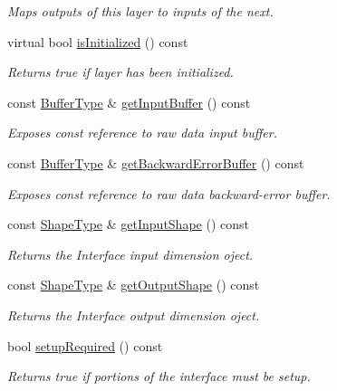 \begin{DoxyCompactItemize}
\begin{DoxyCompactList}\small\item\em Maps outputs of this layer to inputs of the next. \end{DoxyCompactList}\item 
virtual bool \hyperlink{classffnn_1_1layer_1_1_layer_a2166b32e32c3f4e979ed7454ddb5817f}{is\-Initialized} () const 
\begin{DoxyCompactList}\small\item\em Returns true if layer has been initialized. \end{DoxyCompactList}\item 
const \hyperlink{classffnn_1_1layer_1_1_layer_ae755be4e0e146b543c0b46a9b8e0bb01}{Buffer\-Type} \& \hyperlink{classffnn_1_1layer_1_1_layer_a8049c939bc452bd5453227d1ce1a35f3}{get\-Input\-Buffer} () const 
\begin{DoxyCompactList}\small\item\em Exposes const reference to raw data input buffer. \end{DoxyCompactList}\item 
const \hyperlink{classffnn_1_1layer_1_1_layer_ae755be4e0e146b543c0b46a9b8e0bb01}{Buffer\-Type} \& \hyperlink{classffnn_1_1layer_1_1_layer_a0caad62750e9610e607fb18d87df63b8}{get\-Backward\-Error\-Buffer} () const 
\begin{DoxyCompactList}\small\item\em Exposes const reference to raw data backward-\/error buffer. \end{DoxyCompactList}\item 
const \hyperlink{classffnn_1_1layer_1_1_layer_ae2f2d0063ab4b2c2a3a6ebf81f4ec32f}{Shape\-Type} \& \hyperlink{classffnn_1_1layer_1_1_layer_a0f69fc9185b2d496fea7be9a5d9adb62}{get\-Input\-Shape} () const 
\begin{DoxyCompactList}\small\item\em Returns the Interface input dimension oject. \end{DoxyCompactList}\item 
const \hyperlink{classffnn_1_1layer_1_1_layer_ae2f2d0063ab4b2c2a3a6ebf81f4ec32f}{Shape\-Type} \& \hyperlink{classffnn_1_1layer_1_1_layer_a2b6713211f1a5e702ce9ce8cd72e4854}{get\-Output\-Shape} () const 
\begin{DoxyCompactList}\small\item\em Returns the Interface output dimension oject. \end{DoxyCompactList}\item 
bool \hyperlink{classffnn_1_1layer_1_1_layer_a2ed6596711548678da8ef9ed9e59b06c}{setup\-Required} () const 
\begin{DoxyCompactList}\small\item\em Returns true if portions of the interface must be setup. \end{DoxyCompactList}\end{DoxyCompactItemize}
